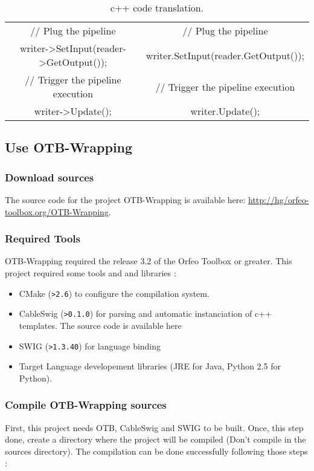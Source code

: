 \begin{landscape}
\begin{table}[!htbp]
\begin{center}
\begin{tabular}{|c|c|}
 // Plug the pipeline                     & // Plug the pipeline  \\
 
 writer->SetInput(reader->GetOutput());   &  writer.SetInput(reader.GetOutput());    \\ 
 
 // Trigger the pipeline execution        &  // Trigger the pipeline  execution\\
 writer->Update();                        &  writer.Update();\\

 
\hline 
\end{tabular}
\caption{c++ code translation.}\label{tab:translatedexample}
\end{center}
\end{table}

\end{landscape}
\normalsize

\subsection{Use OTB-Wrapping}

\subsubsection{Download sources}
The source code for the project OTB-Wrapping is available here: \url{http://hg/orfeo-toolbox.org/OTB-Wrapping}. 

\subsubsection{Required Tools}
OTB-Wrapping required the release 3.2 of the Orfeo Toolbox or greater. This project required some tools and 
and libraries : 
\begin{itemize}
\item CMake (\verb!>2.6!) to configure the compilation system.
\item CableSwig (\verb!>0.1.0!) for parsing and automatic instanciation of c++ templates. The source code is available 
  here
\item SWIG  (\verb!>1.3.40!) for language binding
\item Target Language developement libraries (JRE for Java, Python 2.5 for Python).
\end{itemize}

\subsubsection{Compile OTB-Wrapping sources}
First, this project needs OTB, CableSwig and SWIG to be built. Once, this step done, create a 
directory where the project will be compiled (Don't compile in the sources directory).
The compilation can be done successfully following those steps :

